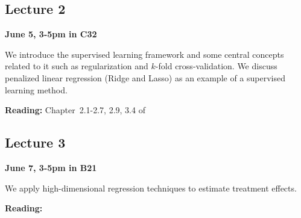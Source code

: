 \documentclass[a4paper]{scrartcl}
\begin{document}
\subsection*{Lecture 2}
\textbf{June 5, 3-5pm in C32}

\vspace*{6pt}\noindent
We introduce the supervised learning framework and some central concepts related to it such as regularization and $k$-fold cross-validation. We discuss penalized linear regression (Ridge and Lasso) as an example of a supervised learning method.


\vspace{10pt}
\textbf{Reading:} Chapter~2.1-2.7, 2.9, 3.4 of \textcite{hastie2009elements}


\subsection*{Lecture 3}
\textbf{June 7, 3-5pm in B21}

\vspace*{6pt}\noindent
We apply high-dimensional regression techniques to estimate treatment effects.


\vspace{10pt}
\textbf{Reading:} \textcite{belloni2014inference,belloni2017program,athey2018approximate}


\nocite{*}

\printbibliography
\end{document}
